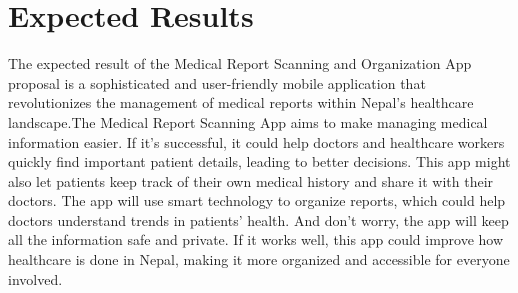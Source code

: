 \chapter{Expected Results}\label{ch:expected_result}
The expected result of the Medical Report Scanning and Organization App proposal is a sophisticated and user-friendly mobile application that revolutionizes the management of medical reports within Nepal's healthcare landscape.The Medical Report Scanning  App aims to make managing medical information easier. If it's successful, it could help doctors and healthcare workers quickly find important patient details, leading to better decisions. This app might also let patients keep track of their own medical history and share it with their doctors. The app will use smart technology to organize reports, which could help doctors understand trends in patients' health. And don't worry, the app will keep all the information safe and private. If it works well, this app could improve how healthcare is done in Nepal, making it more organized and accessible for everyone involved.